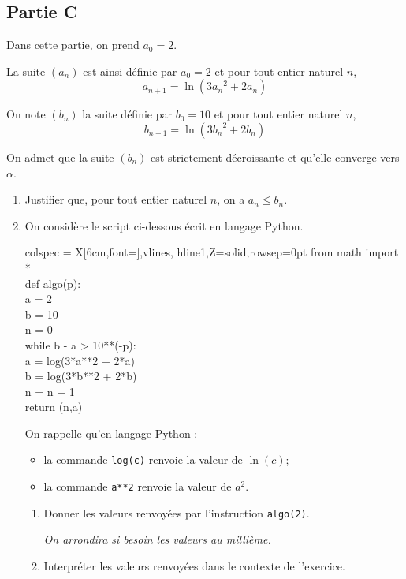 \subsection*{Partie C}
Dans cette partie, on prend $a_{0}=2$.

La suite $(a_{n})$ est ainsi définie par $a_{0}=2$ et pour tout entier naturel $n$,
\[a_{n+1}=\ln \left(3 {a_{n}}^{2}+2 a_{n}\right)\]

On note $(b_{n})$ la suite définie par $b_{0}=10$ et pour tout entier naturel $n$,
\[b_{n+1}=\ln \left(3 {b_{n}}^{2}+2 b_{n}\right)\]

On admet que la suite $\left(b_{n}\right)$ est strictement décroissante et qu'elle converge vers $\alpha$.

\begin{enumerate}
	\item Justifier que, pour tout entier naturel $n$, on a \quad $a_{n} \leqslant b_{n}$.

	\item On considère le script ci-dessous écrit en langage Python.

\begin{center}
	\begin{tblr}{colspec = {X[6cm,font=\ttfamily]},vlines, hline{1,Z}={solid},rowsep={0pt}}
	from math import *\\
	def algo(p):\\
	\quad a = 2\\
	\quad b = 10\\
	\quad n = 0\\
	\quad while b - a > 10**(-p):\\
	\quad \quad a = log(3*a**2 + 2*a)\\
	\quad \quad b = log(3*b**2 + 2*b)\\
	\quad \quad n = n + 1\\
	\quad return (n,a)\\
\end{tblr}
\end{center}

On rappelle qu'en langage Python :

	\begin{itemize}[label=\textbullet~]
		\item la commande \texttt{log(c)} renvoie la valeur de $\ln (c)$;

		\item la commande \texttt{a**2} renvoie la valeur de $a^{2}$.
	\end{itemize}

	\begin{enumerate}
		\item Donner les valeurs renvoyées par l'instruction \texttt{algo(2)}.

		\emph{On arrondira si besoin les valeurs au millième.}

		\item Interpréter les valeurs renvoyées dans le contexte de l'exercice.
	\end{enumerate}
\end{enumerate}
